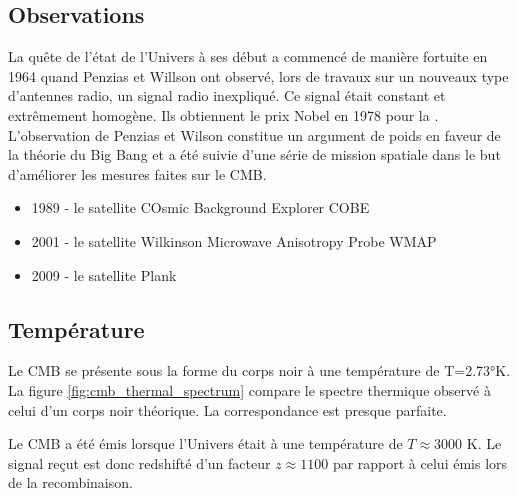 \subsection{Observations}

La quête de l'état de l'Univers à ses début a commencé de manière fortuite en 1964 quand Penzias et Willson ont observé, lors de travaux sur un nouveaux type d’antennes radio, un signal radio inexpliqué.
Ce signal était constant et extrêmement homogène. 
Ils obtiennent le prix Nobel en 1978 pour la \cite{PenziasWilsonNobel}.
L'observation de Penzias et Wilson constitue un argument de poids en faveur de la théorie du Big Bang et a été suivie d'une série de mission spatiale dans le but d'améliorer les mesures faites sur le \ac{CMB}.

\begin{itemize}
\item 1989 - le satellite COsmic Background Explorer COBE 
\item 2001 - le satellite Wilkinson Microwave Anisotropy Probe WMAP
\item 2009 - le satellite Plank
\end{itemize}

\subsection{Température}
Le \ac{CMB} se présente sous la forme du corps noir à une température de T=2.73°K.
La figure \ref{fig:cmb_thermal_spectrum} compare le spectre thermique observé à celui d'un corps noir théorique. 
La correspondance est presque parfaite.

Le \ac{CMB} a été émis lorsque l'Univers était à une température de $T \approx 3000$ K.
Le signal reçut est donc redshifté d'un facteur $z\approx1100$ par rapport à celui émis lors de la recombinaison.

